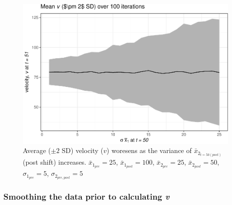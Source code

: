\documentclass[12pt,twoside,openany]{reedthesis}
\begin{document}
\begin{figure}
\centering
\includegraphics{_myDissertation_files/figure-latex/simVarPlot2-1.pdf}
\caption{\label{fig:simVarPlot2}Average (\(\pm 2\) SD) velocity (\(v\))
woresens as the variance of \(\bar{x}_{2_{t=50 (post)}}\) (post shift)
increases. \(\bar{x}_{1_{pre}} = 25\), \(\bar{x}_{1_{post}} = 100\),
\(\bar{x}_{2_{pre}} = 25\), \(\bar{x}_{2_{post}} = 50\),
\(\sigma_{1_{pre}} = 5\), \(\sigma_{2_{pre,post}} = 5\)}
\end{figure}
\subsubsection{\texorpdfstring{Smoothing the data prior to calculating
\emph{v}}{Smoothing the data prior to calculating v}}\label{smoothing-the-data-prior-to-calculating-v}
\end{document}
